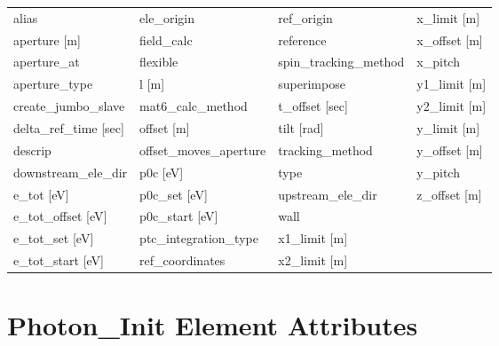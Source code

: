  \begin{tabular}{llll} \toprule
alias                          & ele_origin                     & ref_origin                     & x_limit [m]                    \\
aperture [m]                   & field_calc                     & reference                      & x_offset [m]                   \\
aperture_at                    & flexible                       & spin_tracking_method           & x_pitch                        \\
aperture_type                  & l [m]                          & superimpose                    & y1_limit [m]                   \\
create_jumbo_slave             & mat6_calc_method               & t_offset [sec]                 & y2_limit [m]                   \\
delta_ref_time [sec]           & offset [m]                     & tilt [rad]                     & y_limit [m]                    \\
descrip                        & offset_moves_aperture          & tracking_method                & y_offset [m]                   \\
downstream_ele_dir             & p0c [eV]                       & type                           & y_pitch                        \\
e_tot [eV]                     & p0c_set [eV]                   & upstream_ele_dir               & z_offset [m]                   \\
e_tot_offset [eV]              & p0c_start [eV]                 & wall                           &                                \\
e_tot_set [eV]                 & ptc_integration_type           & x1_limit [m]                   &                                \\
e_tot_start [eV]               & ref_coordinates                & x2_limit [m]                   &                                \\
 \bottomrule
 \end{tabular}
 \vfill

 \section{Photon_Init Element Attributes}
 \label{s:list.photon.init}

